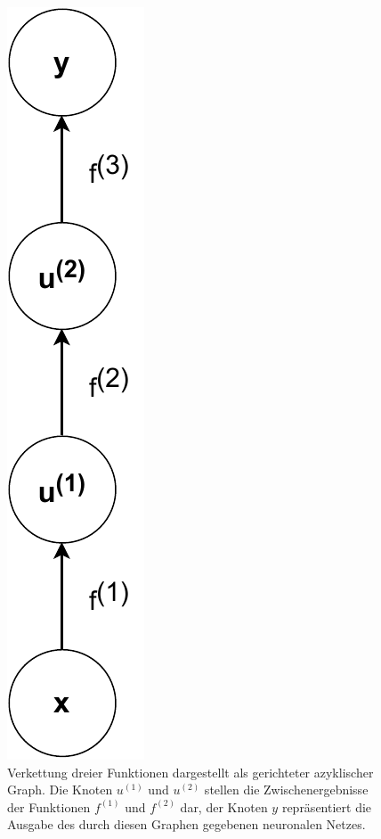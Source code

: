 \begin{figure}
    \centering
    \includegraphics[height=0.3\textheight]{abbildungen/basic_network_graph}
    \caption[Verkettung als Graph]{Verkettung dreier Funktionen dargestellt als
        gerichteter azyklischer Graph. Die Knoten $u^{(1)}$ und
        $u^{(2)}$ stellen die Zwischenergebnisse der Funktionen
        $f^{(1)}$ und $f^{(2)}$ dar, der Knoten $y$ repr\"asentiert
        die Ausgabe des durch diesen Graphen gegebenen neuronalen Netzes.}
    \label{fig:einfacher-graph}
\end{figure}


